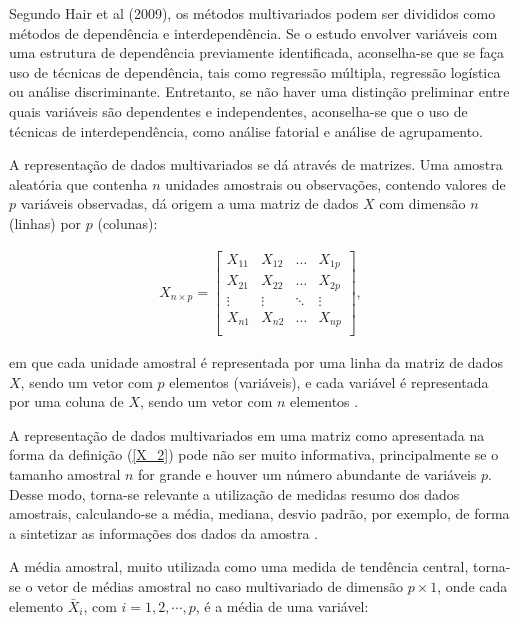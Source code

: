 \documentclass[12pt,a4paper]{article}
\begin{document}
Segundo Hair et al (2009), os métodos multivariados podem ser divididos como métodos de dependência e interdependência. Se o estudo envolver variáveis com uma estrutura de dependência previamente identificada, aconselha-se que se faça uso de técnicas de dependência, tais como regressão múltipla, regressão logística ou análise discriminante. Entretanto, se não haver uma distinção preliminar entre quais variáveis são dependentes e independentes, aconselha-se que o uso de técnicas de interdependência, como análise fatorial e análise de agrupamento.
	
	
A representação de dados multivariados se dá através de matrizes. Uma amostra aleatória que contenha $n$ unidades amostrais ou observações, contendo valores de $p$ variáveis observadas, dá origem a uma matriz de dados $X$ com dimensão $n$ (linhas) por $p$ (colunas):
	
\begin{align}\label{X_2}
    X_{n \times p} =
	\left[
	\begin{array}{cccc}
	    X_{11} & X_{12} & \dots & X_{1p} \\
	    X_{21} & X_{22} & \dots & X_{2p} \\
	    \vdots & \vdots & \ddots & \vdots \\
	    X_{n1} & X_{n2} & \dots & X_{np}\\
	\end{array}
	\right],
\end{align}
	
\noindent em que cada unidade amostral é representada por uma linha da matriz de dados $X$, sendo um vetor com $p$ elementos (variáveis), e cada variável é representada por uma coluna de $X$, sendo um vetor com $n$ elementos \cite{everitt11}.
	
A representação de dados multivariados em uma matriz como apresentada na forma da definição (\ref{X_2}) pode não ser muito informativa, principalmente se o tamanho amostral $n$ for grande e houver um número abundante de variáveis $p$. Desse modo, torna-se relevante a utilização de medidas resumo dos dados amostrais, calculando-se a média, mediana, desvio padrão, por exemplo, de forma a sintetizar as informações dos dados da amostra \cite{ferreira11}.  
	
A média amostral, muito utilizada como uma medida de tendência central, torna-se o vetor de médias amostral no caso multivariado de dimensão $p \times 1$, onde cada elemento $\bar{X}_{i}$, com $i = 1,2,\cdots,p $, é a média de uma variável:
	
\end{document}
